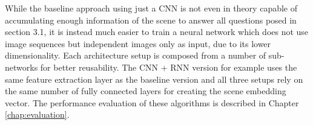     While the baseline approach using just a CNN is not even in theory capable of accumulating enough
information of the scene to answer all questions posed in section 3.1, it is instead much easier to
train a neural network which does not use image sequences but independent images only as input, due
to its lower dimensionality. Each architecture setup is composed from a number of sub-networks for
better reusability. The CNN + RNN version for example uses the same feature extraction layer as the
baseline version and all three setups rely on the same number of fully connected layers for creating the
scene embedding vector. 
The performance evaluation of these algorithms is described in Chapter \ref{chap:evaluation}.
